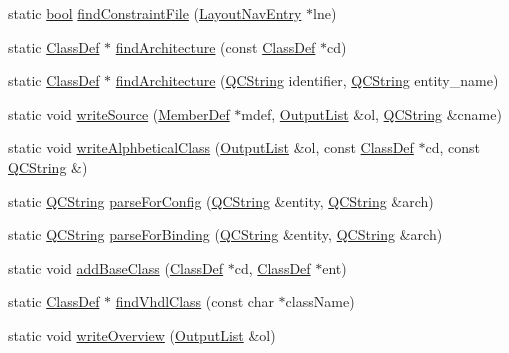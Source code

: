 \begin{DoxyCompactItemize}
\item 
static \hyperlink{qglobal_8h_a1062901a7428fdd9c7f180f5e01ea056}{bool} \hyperlink{class_vhdl_doc_gen_a8879c8899b889e4c595e128841054861}{find\+Constraint\+File} (\hyperlink{struct_layout_nav_entry}{Layout\+Nav\+Entry} $\ast$lne)
\item 
static \hyperlink{class_class_def}{Class\+Def} $\ast$ \hyperlink{class_vhdl_doc_gen_a85060afa6fb3a871770412d06d445f62}{find\+Architecture} (const \hyperlink{class_class_def}{Class\+Def} $\ast$cd)
\item 
static \hyperlink{class_class_def}{Class\+Def} $\ast$ \hyperlink{class_vhdl_doc_gen_adb468ffc3a78f01a58bd6ca92dcc10ec}{find\+Architecture} (\hyperlink{class_q_c_string}{Q\+C\+String} identifier, \hyperlink{class_q_c_string}{Q\+C\+String} entity\+\_\+name)
\item 
static void \hyperlink{class_vhdl_doc_gen_ae08bfd74e8450f8abc4fb3a265d6b24a}{write\+Source} (\hyperlink{class_member_def}{Member\+Def} $\ast$mdef, \hyperlink{class_output_list}{Output\+List} \&ol, \hyperlink{class_q_c_string}{Q\+C\+String} \&cname)
\item 
static void \hyperlink{class_vhdl_doc_gen_a62637da4d5b53a0243289ac6a4af2011}{write\+Alphbetical\+Class} (\hyperlink{class_output_list}{Output\+List} \&ol, const \hyperlink{class_class_def}{Class\+Def} $\ast$cd, const \hyperlink{class_q_c_string}{Q\+C\+String} \&)
\item 
static \hyperlink{class_q_c_string}{Q\+C\+String} \hyperlink{class_vhdl_doc_gen_a4584e2262b81979f6d9b88c070c78753}{parse\+For\+Config} (\hyperlink{class_q_c_string}{Q\+C\+String} \&entity, \hyperlink{class_q_c_string}{Q\+C\+String} \&arch)
\item 
static \hyperlink{class_q_c_string}{Q\+C\+String} \hyperlink{class_vhdl_doc_gen_a411f4f042964d6e24c0376f1378da1a8}{parse\+For\+Binding} (\hyperlink{class_q_c_string}{Q\+C\+String} \&entity, \hyperlink{class_q_c_string}{Q\+C\+String} \&arch)
\item 
static void \hyperlink{class_vhdl_doc_gen_a4892ca19efc7055ce4b5c3004ce550ed}{add\+Base\+Class} (\hyperlink{class_class_def}{Class\+Def} $\ast$cd, \hyperlink{class_class_def}{Class\+Def} $\ast$ent)
\item 
static \hyperlink{class_class_def}{Class\+Def} $\ast$ \hyperlink{class_vhdl_doc_gen_a03533511b8edfac47bb8e53b9cfb1d3d}{find\+Vhdl\+Class} (const char $\ast$class\+Name)
\item 
static void \hyperlink{class_vhdl_doc_gen_a4c14772902ff4d4bf2a55291debd628e}{write\+Overview} (\hyperlink{class_output_list}{Output\+List} \&ol)

\end{DoxyCompactItemize}
